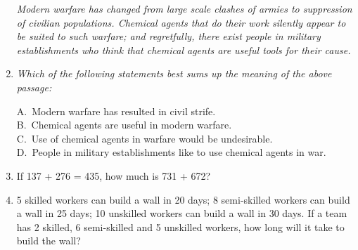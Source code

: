 \documentclass[journal,12pt,onecolumn]{IEEEtran}
\theoremstyle{remark}
\begin{document}
\begin{enumerate}
\setlength{\parskip}{0.5cm}


\setlength{\parskip}{0.5cm}

 \textit{Modern warfare has changed from large scale clashes of armies to suppression of civilian populations. Chemical agents that do their work silently appear to be suited to such warfare; and regretfully, there exist people in military establishments who think that chemical agents are useful tools for their cause.}

\vspace{0.3cm}
\noindent\item\textit{ Which of the following statements best sums up the meaning of the above passage:}

\hfill{}

A.\ Modern warfare has resulted in civil strife. \\
B.\ Chemical agents are useful in modern warfare.\\
C.\ Use of chemical agents in warfare would be undesirable. \\
D.\ People in military establishments like to use chemical agents in war.

\noindent\item If 137 + 276 = 435, how much is 731 + 672?

\hfill{}
\begin{enumerate}
\end{enumerate}

\setlength{\parskip}{0.5cm}

\noindent\item 5 skilled workers can build a wall in 20 days; 8 semi-skilled workers can build a wall in 25 days; 10 unskilled workers can build a wall in 30 days. If a team has 2 skilled, 6 semi-skilled and 5 unskilled workers, how long will it take to build the wall?

\hfill{}
\begin{enumerate}
\end{enumerate}


\end{enumerate}
\end{document}
